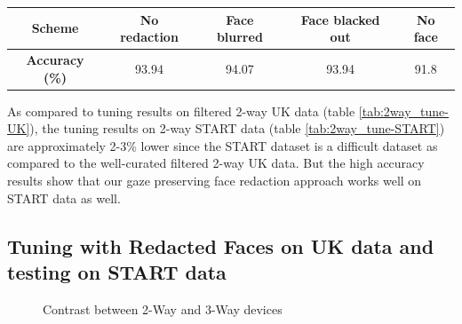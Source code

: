 \begin{table}[h]
\begin{tabular}{|c||c|c|c|c|}
      \hline
      \textbf{Scheme} & No redaction & Face blurred & Face blacked out & No face \\
      \hline
      \textbf{Accuracy (\%)} & 93.94 & 94.07 & 93.94 & 91.8 \\
      \hline
    \end{tabular}  
\end{table}

As compared to tuning results on filtered 2-way UK data (table \ref{tab:2way_tune-UK}), the tuning results on 2-way START data (table \ref{tab:2way_tune-START}) are approximately 2-3\% lower since the START dataset is a difficult dataset as compared to the well-curated filtered 2-way UK data. But the high accuracy results show that our gaze preserving face redaction approach works well on START data as well.


\subsection{Tuning with Redacted Faces on UK data and testing on START data}

\begin{figure}[h]
    \centering
    \captionsetup[subfigure]{justification=centering}
    \quad
    \caption{Contrast between 2-Way and 3-Way devices}
    \label{fig:2waySTARTdevice_vs_3wayUKdevice}
\end{figure}

